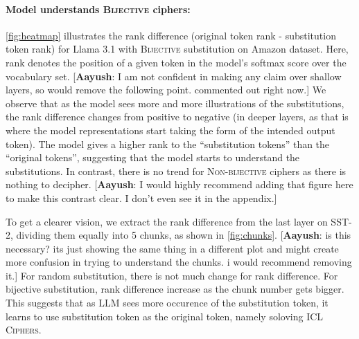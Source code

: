 \documentclass[11pt]{article}
\newcommand{\aayush}[1]{{\color{green}[{\bf Aayush}: #1]}}
\newcommand{\name}{\textsc{ICL Ciphers}}
\newcommand{\llama}{Llama 3.1 }
\begin{document}
\paragraph{Model understands \textsc{Bijective} ciphers:}\autoref{fig:heatmap} illustrates the rank difference (original token rank - substitution token rank) for \llama with \textsc{Bijective} substitution on Amazon dataset. Here, rank denotes the position of a given token in the model's softmax score over the vocabulary set.
\aayush{I am not confident in making any claim over shallow layers, so would remove the following point. commented out right now.}
We observe that as the model sees more and more illustrations of the substitutions, the rank difference changes from positive to negative (in deeper layers, as that is where the model representations start taking the form of the intended output token). The model gives a higher rank to the ``substitution tokens'' than the  ``original tokens'', suggesting that the model starts to understand the substitutions. In contrast, there is no trend for \textsc{Non-bijective} ciphers as there is nothing to decipher. \aayush{I would highly recommend adding that figure here to make this contrast clear. I don't even see it in the appendix.}

To get a clearer vision, we extract the rank difference from the last layer on SST-2, dividing them equally into 5 chunks, as shown in \autoref{fig:chunks}. \aayush{is this necessary? its just showing the same thing in a different plot and might create more confusion in trying to understand the chunks. i would recommend removing it.}
For random substitution, there is not much change for rank difference.
For bijective substitution, rank difference increase as the chunk number gets bigger.
This suggests that as LLM sees more  occurence of the substitution token, it learns to use substitution token as the original token, namely soloving \name.

\end{document}
